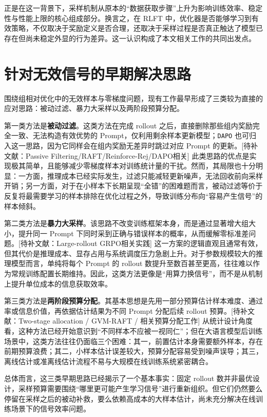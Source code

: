 正是在这一背景下，采样机制从原本的“数据获取步骤”上升为影响训练效率、稳定性与性能上限的核心组成部分。换言之，在 RLFT 中，优化器是否能够学习到有效策略，不仅取决于奖励定义是否合理，还取决于采样过程是否真正触达了模型已存在但尚未稳定外显的行为差异。这一认识构成了本文相关工作的共同出发点。

\section{针对无效信号的早期解决思路}

围绕组相对优化中的无效样本与零梯度问题，现有工作最早形成了三类较为直接的应对思路：被动过滤、暴力大采样以及两阶段预算分配。

第一类方法是\textbf{被动过滤}。这类方法在完成 rollout 之后，直接删除那些组内奖励完全一致、无法构造有效优势的 Prompt，仅利用剩余样本更新模型；\texttt{DAPO} 也可归入这一思路，因为它同样会在组内奖励无差异时跳过对应 Prompt 的更新。[待补文献：Passive Filtering/RAFT/Reinforce-Rej/DAPO相关] 此类思路的优点是实现极其简单，且能够减少零梯度样本对训练统计量的干扰。然而，其局限也十分明显：一方面，推理成本已经实际发生，过滤只能减轻更新噪声，无法回收前向采样开销；另一方面，对于在小样本下长期呈现“全错”的困难题而言，被动过滤等价于反复将最需要学习的样本排除在优化过程之外，导致训练分布向“容易产生信号”的样本倾斜。

第二类方法是\textbf{暴力大采样}。该思路不改变训练框架本身，而是通过显著增大组大小，提升同一 Prompt 下同时采到正确与错误样本的概率，从而缓解零标准差问题。[待补文献：Large-rollout GRPO相关实践] 这一方案的逻辑直观且通常有效，但其代价是推理成本、显存占用与系统调度压力急剧上升。对于参数规模较大的推理模型而言，单纯将每个 Prompt 的 rollout 数提升至数百甚至更高，往往难以作为常规训练配置长期维持。因此，这类方法更像是“用算力换信号”，而不是从机制上提升单位成本的信息获取效率。

第三类方法是\textbf{两阶段预算分配}。其基本思想是先用一部分预算估计样本难度、通过率或信息价值，再依据估计结果为不同 Prompt 分配后续 rollout 预算。[待补文献：Two-stage allocation / GVM-RAFT / 相关预算分配工作] 从统计设计角度看，这种方法已经开始意识到“不同样本不应被一视同仁”；但在大语言模型后训练场景中，这类方法往往仍面临三个困难：其一，前置估计本身需要额外样本，存在前期预算浪费；其二，小样本估计误差较大，预算分配容易受到噪声误导；其三，离线估计或准离线估计流程不易与大规模在线训练系统紧密耦合。

总体而言，这三类早期思路已经揭示了一个基本事实：固定 rollout 数并非最优设计，采样预算需要围绕“哪里更可能产生学习信号”进行重新组织。但它们仍然要么停留在采样之后的被动补救，要么依赖高成本的大样本估计，尚未充分解决在线训练场景下的信号效率问题。

